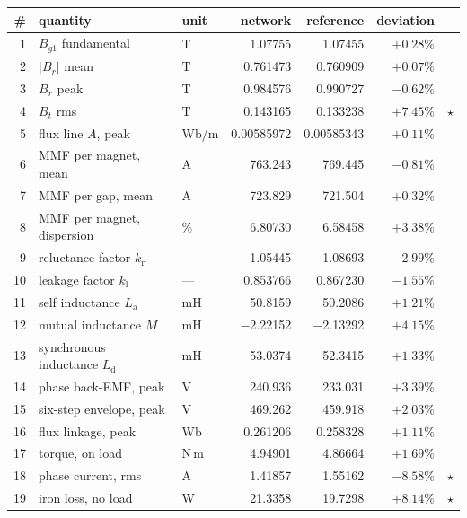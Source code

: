 \documentclass[10pt,a4paper,twocolumn]{article}
\theoremstyle{plain}
\theoremstyle{remark}
\begin{document}
\begin{table}[!t]
\centering
\begin{threeparttable}
\footnotesize
\setlength{\tabcolsep}{5pt}
\begin{tabular}{@{}rllrrrc@{}}
\toprule
\# & quantity & unit & network & reference & deviation & \\
\midrule
1 & $B_{g1}$ fundamental & T & \num{1.07755} & \num{1.07455} & $+0.28\%$ & \\
2 & $|B_r|$ mean & T & \num{0.761473} & \num{0.760909} & $+0.07\%$ & \\
3 & $B_r$ peak & T & \num{0.984576} & \num{0.990727} & $-0.62\%$ & \\
4 & $B_t$ rms & T & \num{0.143165} & \num{0.133238} & $+7.45\%$ & $\star$\\
5 & flux line $A$, peak & Wb/m & \num{0.00585972} & \num{0.00585343} & $+0.11\%$ & \\
6 & MMF per magnet, mean & A & \num{763.243} & \num{769.445} & $-0.81\%$ & \\
7 & MMF per gap, mean & A & \num{723.829} & \num{721.504} & $+0.32\%$ & \\
8 & MMF per magnet, dispersion & \% & \num{6.80730} & \num{6.58458} & $+3.38\%$ & \\
9 & reluctance factor $k_{\mathrm{r}}$ & --- & \num{1.05445} & \num{1.08693} & $-2.99\%$ & \\
10 & leakage factor $k_{\mathrm{l}}$ & --- & \num{0.853766} & \num{0.867230} & $-1.55\%$ & \\
11 & self inductance $L_{\mathrm{a}}$\tnote{c} & mH & \num{50.8159} & \num{50.2086} & $+1.21\%$ & \\
12 & mutual inductance $M$\tnote{c} & mH & \num{-2.22152} & \num{-2.13292} & $+4.15\%$ & \\
13 & synchronous inductance $L_{\mathrm{d}}$\tnote{c} & mH & \num{53.0374} & \num{52.3415} & $+1.33\%$ & \\
14 & phase back-EMF, peak & V & \num{240.936} & \num{233.031} & $+3.39\%$ & \\
15 & six-step envelope, peak & V & \num{469.262} & \num{459.918} & $+2.03\%$ & \\
16 & flux linkage, peak & Wb & \num{0.261206} & \num{0.258328} & $+1.11\%$ & \\
17 & torque, on load & N\,m & \num{4.94901} & \num{4.86664} & $+1.69\%$ & \\
18 & phase current, rms & A & \num{1.41857} & \num{1.55162} & $-8.58\%$ & $\star$\\
19 & iron loss, no load & W & \num{21.3358} & \num{19.7298} & $+8.14\%$ & $\star$\\

\end{tabular}
\end{threeparttable}
\end{table}
\end{document}
